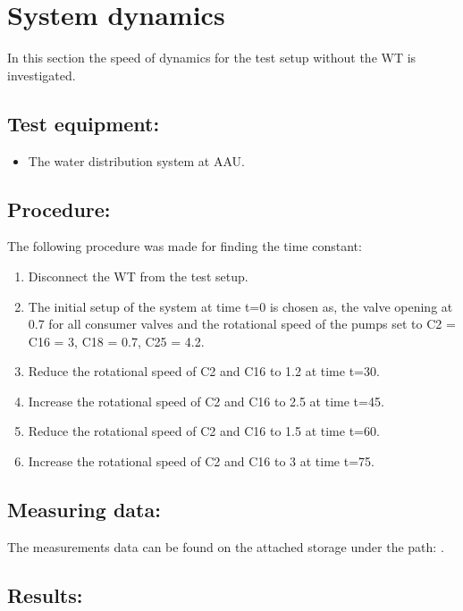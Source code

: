 \section{System dynamics}
\label{sec:pipe_dynamics}

In this section the speed of dynamics for the test setup without the WT is investigated.

\subsection*{Test equipment:}
\begin{itemize}
\item The water distribution system at AAU.
\end{itemize}

\subsection*{Procedure:}
The following procedure was made for finding the time constant:
\begin{enumerate}
\item Disconnect the WT from the test setup.  
\item The initial setup of the system at time t=0 is chosen as, the valve opening at 0.7 for all consumer valves and the rotational speed of the pumps set to C2 = C16 = 3, C18 = 0.7, C25 = 4.2.
\item Reduce the rotational speed of C2 and C16 to 1.2 at time t=30.
\item Increase the rotational speed of C2 and C16 to 2.5 at time t=45.
\item Reduce the rotational speed of C2 and C16 to 1.5 at time t=60.
\item Increase the rotational speed of C2 and C16 to 3 at time t=75.
\end{enumerate}

\subsection*{Measuring data:}
The measurements data can be found on the attached storage under the path: .

\subsection*{Results:}

